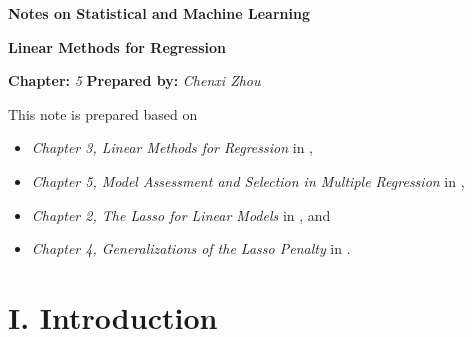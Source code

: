 \documentclass[12pt]{article}
\newcommand{\titlebox}[4]{
\begin{tcolorbox}[colback = blue!5!white!95, colframe = blue!70!black
]
  \noindent \textbf{ #1 } \hfill \textit{#2} 
  \begin{center}
  	 \LARGE{\textbf{#3}}
  \end{center}
\textbf{Chapter:} \textit{#4} \hfill \textbf{Prepared by:} \textit{Chenxi Zhou}
\end{tcolorbox}
}
\begin{document}
\titlebox{Notes on Statistical and Machine Learning}{}{Linear Methods for Regression}{5}
\thispagestyle{plain}

\vspace{10pt}

This note is prepared based on 
\begin{itemize}
	\item \textit{Chapter 3, Linear Methods for Regression} in \textcite{Friedman2001-np}, 
	\item \textit{Chapter 5, Model Assessment and Selection in Multiple Regression} in \textcite{Izenman2009-jk}, 
	\item \textit{Chapter 2, The Lasso for Linear Models} in \textcite{Hastie2015-rm}, and
	\item \textit{Chapter 4, Generalizations of the Lasso Penalty} in \textcite{Hastie2015-rm}. 
\end{itemize}

\section*{I. Introduction}
\end{document}
